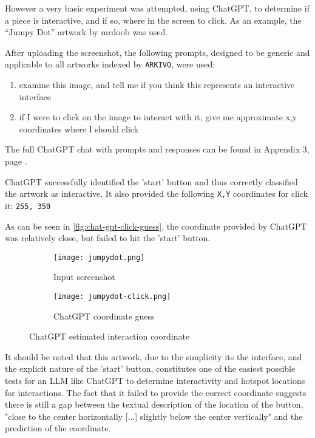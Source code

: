 However a very basic experiment was attempted, using ChatGPT, to determine if a piece is interactive, and if so, where in the screen to click. As an example, the ``Jumpy Dot'' artwork by mrdoob was used.

After uploading the screenshot, the following prompts, designed to be generic and applicable to all artworks indexed by \texttt{ARKIVO}, were used:

\begin{enumerate}
	\item examine this image, and tell me if you think this represents an interactive interface
	\item if I were to click on the image to interact with it, give me approximate x,y coordinates where I should click
\end{enumerate}


The full ChatGPT chat with prompts and responses can be found in Appendix 3, page \pageref{chap:chatgpt-mouse}.

ChatGPT successfully identified the 'start' button and thus correctly classified the artwork as interactive. It also provided the following \texttt{X,Y} coordinates for click it: \texttt{255, 350}

As can be seen in \autoref{fig:chat-gpt-click-guess}, the coordinate provided by ChatGPT was relatively close, but failed to hit the 'start' button.

\begin{figure}[H]
  \centering
  \begin{subfigure}[b]{0.45\textwidth}
    \centering
    \texttt{[image: jumpydot.png]}
    \caption{Input screenshot}
    \label{fig:image1}
  \end{subfigure}
  \hfill
  \begin{subfigure}[b]{0.45\textwidth}
    \centering
    \texttt{[image: jumpydot-click.png]}
    \caption{ChatGPT coordinate guess}
    \label{fig:image2}
  \end{subfigure}
  \caption{ChatGPT estimated interaction coordinate}
  \label{fig:chat-gpt-click-guess}
\end{figure}

It should be noted that this artwork, due to the simplicity its the interface, and the explicit nature of the 'start' button, constitutes one of the easiest possible tests for an LLM like ChatGPT to determine interactivity and hotspot locations for interactions. The fact that it failed to provide the correct coordinate suggests there is still a gap between the textual description of the location of the button, "close to the center horizontally [...] slightly below the center vertically" and the prediction of the coordinate.

